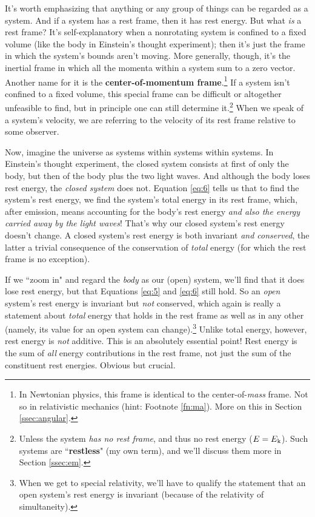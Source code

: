 \documentclass[12pt]{article}
\begin{document}
It's worth emphasizing that anything or any group of things can be regarded as a system. And if a system has a rest frame, then it has rest energy. But what \emph{is} a rest frame? It's self-explanatory when a nonrotating system is confined to a fixed volume (like the body in Einstein's thought experiment); then it's just the frame in which the system's bounds aren't moving. More generally, though, it's the inertial frame in which all the momenta within a system sum to a zero vector. Another name for it is the \textbf{center-of-momentum frame}.\footnote{In Newtonian physics, this frame is identical to the center-of-\emph{mass} frame. Not so in relativistic mechanics (hint: Footnote \ref{fn:ma}). More on this in Section \ref{ssec:angular}.} If a system isn't confined to a fixed volume, this special frame can be difficult or altogether unfeasible to find, but in principle one can still determine it.\footnote{\label{fn:rl}Unless the system \emph{has no rest frame}, and thus no rest energy ($E = E_{\mkern.5mu \textrm{k}}$). Such systems are ``\textbf{restless}" (my own term), and we'll discuss them more in Section \ref{ssec:em}.} When we speak of a system's velocity, we are referring to the velocity of its rest frame relative to some observer.

Now, imagine the universe as systems within systems within systems. In Einstein's thought experiment, the closed system consists at first of only the body, but then of the body plus the two light waves. And although the body loses rest energy, the \emph{closed system} does not. Equation \ref{eq:6} tells us that to find the system's rest energy, we find the system's total energy in its rest frame, which, after emission, means accounting for the body's rest energy \emph{and also the energy carried away by the light waves}! That's why our closed system's rest energy doesn't change. A closed system's rest energy is both invariant \emph{and conserved}, the latter a trivial consequence of the conservation of \emph{total} energy (for which the rest frame is no exception).

If we ``zoom in" and regard the \emph{body} as our (open) system, we'll find that it does lose rest energy, but that Equations \ref{eq:5} and \ref{eq:6} still hold. So an \emph{open} system's rest energy is invariant but \emph{not} conserved, which again is really a statement about \emph{total} energy that holds in the rest frame as well as in any other (namely, its value for an open system can change).\footnote{When we get to special relativity, we'll have to qualify the statement that an open system's rest energy is invariant (because of the relativity of simultaneity).} Unlike total energy, however, rest energy is \emph{not} additive. This is an absolutely essential point! Rest energy is the sum of \emph{all} energy contributions in the rest frame, not just the sum of the constituent rest energies. Obvious but crucial.
\end{document}
